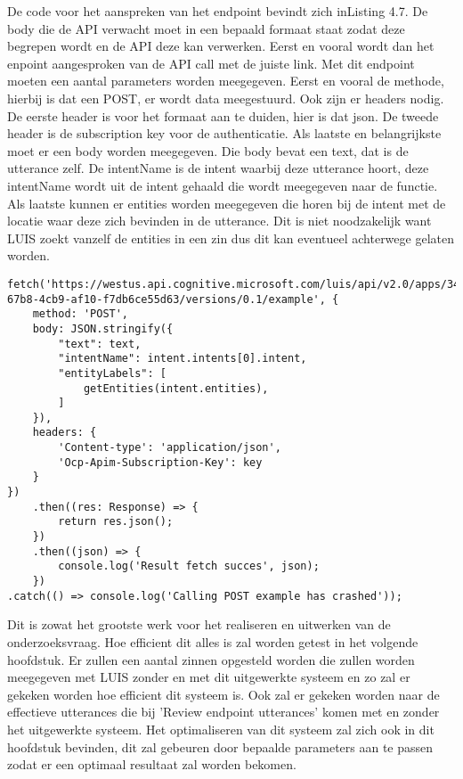 De code voor het aanspreken van het endpoint bevindt zich inListing 4.7. De body die de API verwacht moet in een bepaald formaat staat zodat deze begrepen wordt en de API deze kan verwerken. Eerst en vooral wordt dan het enpoint aangesproken van de API call met de juiste link. Met dit endpoint moeten een aantal parameters worden meegegeven. Eerst en vooral de methode, hierbij is dat een POST, er wordt data meegestuurd. Ook zijn er headers nodig. De eerste header is voor het formaat aan te duiden, hier is dat json. De tweede header is de subscription key voor de authenticatie. Als laatste en belangrijkste moet er een body worden meegegeven. Die body bevat een text, dat is de utterance zelf. De intentName is de intent waarbij deze utterance hoort, deze intentName wordt uit de intent gehaald die wordt meegegeven naar de functie. Als laatste kunnen er entities worden meegegeven die horen bij de intent met de locatie waar deze zich bevinden in de utterance. Dit is niet noodzakelijk want LUIS zoekt vanzelf de entities in een zin dus dit kan eventueel achterwege gelaten worden.

\medskip
\begin{lstlisting}[caption=Toevoegen van een input aan LUIS van een API call]
fetch('https://westus.api.cognitive.microsoft.com/luis/api/v2.0/apps/3480e277-67b8-4cb9-af10-f7db6ce55d63/versions/0.1/example', {
	method: 'POST',
	body: JSON.stringify({
		"text": text,
		"intentName": intent.intents[0].intent,
		"entityLabels": [
			getEntities(intent.entities),
		]
	}),
	headers: {
		'Content-type': 'application/json',
		'Ocp-Apim-Subscription-Key': key
	}
})
	.then((res: Response) => {
		return res.json();
	})
	.then((json) => {
		console.log('Result fetch succes', json);
	})
.catch(() => console.log('Calling POST example has crashed'));
\end{lstlisting}

Dit is zowat het grootste werk voor het realiseren en uitwerken van de onderzoeksvraag. Hoe efficient dit alles is zal worden getest in het volgende hoofdstuk. Er zullen een aantal zinnen opgesteld worden die zullen worden meegegeven met LUIS zonder en met dit uitgewerkte systeem en zo zal er gekeken worden hoe efficient dit systeem is. Ook zal er gekeken worden naar de effectieve utterances die bij 'Review endpoint utterances' komen met en zonder het uitgewerkte systeem. Het optimaliseren van dit systeem zal zich ook in dit hoofdstuk bevinden, dit zal gebeuren door bepaalde parameters aan te passen zodat er een optimaal resultaat zal worden bekomen.

